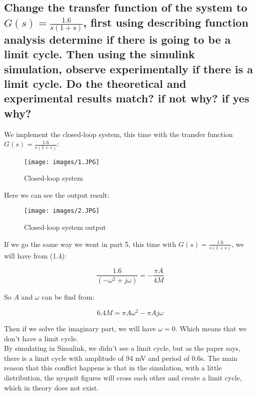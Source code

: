 \documentclass[11pt]{scrartcl} %
\begin{document}
\subsection{Change the transfer function of the system to $G(s)=\frac{1.6}{s(1+s)}$, ﬁrst using describing function analysis determine if there is going to be a limit cycle. Then using the simulink simulation, observe experimentally if there is a limit cycle. Do the theoretical and experimental results match? if not why? if yes why?}
We implement the closed-loop system, this time with the transfer function $G(s)=\frac{1.6}{s(1+s)}$:
\begin{figure}[H]
	\centering
	\texttt{[image: images/1.JPG]}
	\caption{Closed-loop system}
\end{figure}
Here we can see the output result:
\begin{figure}[H]
	\centering
	\texttt{[image: images/2.JPG]}
	\caption{Closed-loop system output}
\end{figure}
If we go the same way we went in part 5, this time with $G(s)=\frac{1.6}{s(1+s)}$, we will have from (1.4):

\begin{equation}
    \frac{1.6}{(-\omega ^2 + j\omega)} = -\frac{\pi A}{4M}
\end{equation}

So $A$ and $\omega$ can be find from:

\begin{equation}
    6.4M = \pi A\omega ^2 - \pi A j\omega
\end{equation}

Then if we solve the imaginary part, we will have $\omega = 0$. Which means that we don't have a limit cycle.\\

By simulating in Simulink, we didn't see a limit cycle, but as the paper says, there is a limit cycle with amplitude of 94 mV and period of 0.6s. The main reason that this conflict happens is that in the simulation, with a little distribution, the nyqusit figures will cross each other and create a limit cycle, which in theory does not exist.


\end{document}
